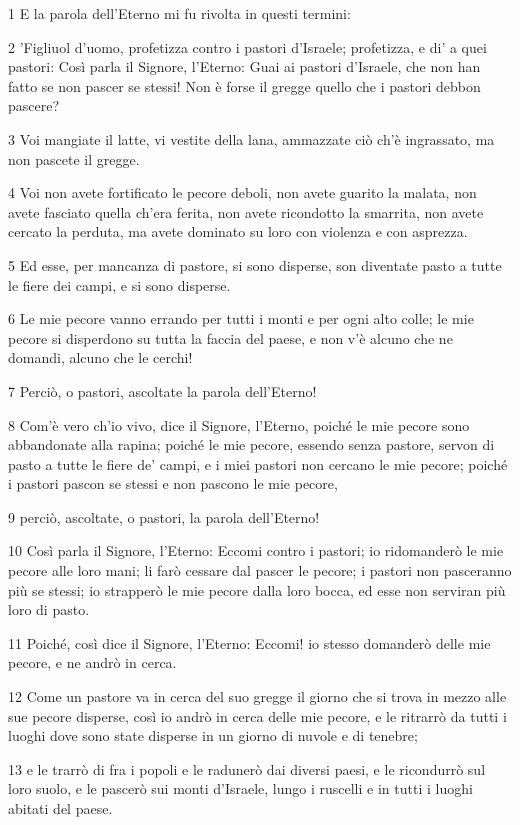 \par 1 E la parola dell'Eterno mi fu rivolta in questi termini:
\par 2 'Figliuol d'uomo, profetizza contro i pastori d'Israele; profetizza, e di' a quei pastori: Così parla il Signore, l'Eterno: Guai ai pastori d'Israele, che non han fatto se non pascer se stessi! Non è forse il gregge quello che i pastori debbon pascere?
\par 3 Voi mangiate il latte, vi vestite della lana, ammazzate ciò ch'è ingrassato, ma non pascete il gregge.
\par 4 Voi non avete fortificato le pecore deboli, non avete guarito la malata, non avete fasciato quella ch'era ferita, non avete ricondotto la smarrita, non avete cercato la perduta, ma avete dominato su loro con violenza e con asprezza.
\par 5 Ed esse, per mancanza di pastore, si sono disperse, son diventate pasto a tutte le fiere dei campi, e si sono disperse.
\par 6 Le mie pecore vanno errando per tutti i monti e per ogni alto colle; le mie pecore si disperdono su tutta la faccia del paese, e non v'è alcuno che ne domandi, alcuno che le cerchi!
\par 7 Perciò, o pastori, ascoltate la parola dell'Eterno!
\par 8 Com'è vero ch'io vivo, dice il Signore, l'Eterno, poiché le mie pecore sono abbandonate alla rapina; poiché le mie pecore, essendo senza pastore, servon di pasto a tutte le fiere de' campi, e i miei pastori non cercano le mie pecore; poiché i pastori pascon se stessi e non pascono le mie pecore,
\par 9 perciò, ascoltate, o pastori, la parola dell'Eterno!
\par 10 Così parla il Signore, l'Eterno: Eccomi contro i pastori; io ridomanderò le mie pecore alle loro mani; li farò cessare dal pascer le pecore; i pastori non pasceranno più se stessi; io strapperò le mie pecore dalla loro bocca, ed esse non serviran più loro di pasto.
\par 11 Poiché, così dice il Signore, l'Eterno: Eccomi! io stesso domanderò delle mie pecore, e ne andrò in cerca.
\par 12 Come un pastore va in cerca del suo gregge il giorno che si trova in mezzo alle sue pecore disperse, così io andrò in cerca delle mie pecore, e le ritrarrò da tutti i luoghi dove sono state disperse in un giorno di nuvole e di tenebre;
\par 13 e le trarrò di fra i popoli e le radunerò dai diversi paesi, e le ricondurrò sul loro suolo, e le pascerò sui monti d'Israele, lungo i ruscelli e in tutti i luoghi abitati del paese.
